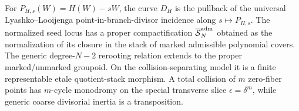 \fi

\ifdefined\DecoratedNormalizationPaper
\else

\begin{proposition}
\label{prop:hurwitz-ll-compactification}
For $P_{H,s}(W)=H(W)-sW$, the curve $D_H$ is the pullback of the
universal Lyashko--Looijenga point-in-branch-divisor incidence along
$s\mapsto P_{H,s}$.  The normalized seed locus has a proper compactification
$\overline{\mathcal S}^{\rm adm}_N$ obtained as the normalization of its
closure in the stack of marked admissible polynomial covers.  The generic
degree-$N-2$ rerooting relation extends to the proper marked/unmarked
groupoid.  On the collision-separating model it is a finite representable
etale quotient-stack morphism.  A total collision of $m$ zero-fiber points
has $m$-cycle monodromy on the special transverse slice
$\epsilon=\delta^m$, while generic coarse divisorial inertia is a
transposition.
\end{proposition}

